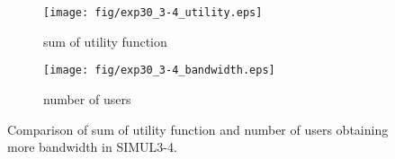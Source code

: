 \begin{figure}
	\begin{center}
		\begin{subfigure}[b]{0.8\textwidth}
			\centering
			\texttt{[image: fig/exp30\_3-4\_utility.eps]}
			\caption{sum of utility function}
			\label{figure:simul3_4_u_a}
		\end{subfigure}
		\begin{subfigure}[b]{0.8\textwidth}
			\centering
			\texttt{[image: fig/exp30\_3-4\_bandwidth.eps]}
			\caption{number of users}
			\label{figure:simul3_4_u_b}
		\end{subfigure}
		\caption{Comparison of sum of utility function and number of users obtaining more bandwidth in SIMUL3-4.}
		\label{figure:simul3_4_u}
	\end{center}
\end{figure}

\clearpage

